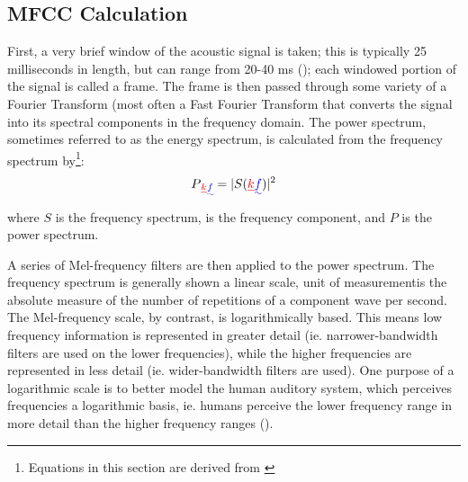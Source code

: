 \DIFdelbegin \subsubsection{}%
\addtocounter{subsubsection}{-1}%
\DIFdelend \DIFaddbegin \subsection{MFCC Calculation}\DIFaddend \label{sec:mfcc-calc}

First, a very brief window of the acoustic signal is taken; this is typically 25 milliseconds in length, but can range from 20-40 ms (\cite{vergin:99,molau:01}); each windowed portion of the signal is called a frame.  The frame is then passed through some variety of a Fourier Transform (most often a Fast Fourier Transform \DIFdelbegin {}\DIFdelend \DIFaddbegin {}\DIFaddend that converts the signal into its spectral components in the frequency domain.  The power spectrum, sometimes referred to as the energy spectrum, is calculated from the frequency spectrum by\footnote{Equations in this section are derived from \cite{vergin:99}}: \begin{equation}\label{eq:power-spectrum} P\DIFdelbegin \DIFdel{_k }\DIFdelend \DIFaddbegin \DIFadd{_f }\DIFaddend = |S(\DIFdelbegin \DIFdel{k}\DIFdelend \DIFaddbegin \DIFadd{f}\DIFaddend )|^2 \end{equation} where $S$ is the frequency spectrum, \DIFdelbegin {}\DIFdelend \DIFaddbegin {}\DIFaddend is the frequency component, and $P$ is the power spectrum.

A series of Mel-frequency filters are then applied to the power spectrum.  The frequency spectrum is generally shown \DIFdelbegin {}\DIFdelend \DIFaddbegin {}\DIFaddend a linear scale, \DIFdelbegin {}\DIFdelend \DIFaddbegin {}\DIFaddend unit of measurement\DIFdelbegin {}\DIFdelend \DIFaddbegin {}\DIFaddend is the absolute measure of the number of repetitions of a component wave per second.  The Mel-frequency scale, by contrast, is logarithmically based.  This means low frequency information is represented in greater detail (ie. narrower-bandwidth filters are used on the lower frequencies), while the higher frequencies are represented in less detail (ie. wider-bandwidth filters are used).  One purpose of a logarithmic scale is to better model the human auditory system, which perceives frequencies \DIFdelbegin {}\DIFdelend \DIFaddbegin {}\DIFaddend a logarithmic basis, ie. humans perceive the lower frequency range in more detail than the higher frequency ranges (\cite{rosen:91}).

